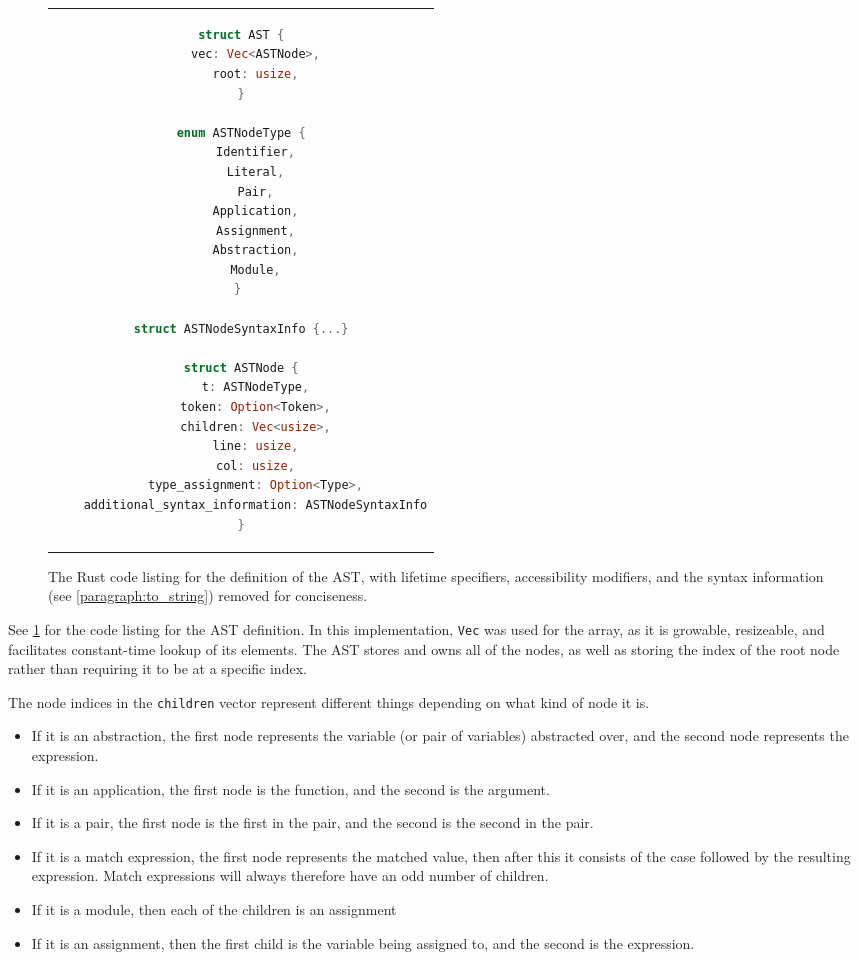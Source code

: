 \begin{figure}[t]
    \centering
    \begin{tabular}{c}
    \begin{lstlisting}[language=Rust]
struct AST {
    vec: Vec<ASTNode>,
    root: usize,
}

enum ASTNodeType {
    Identifier,
    Literal,
    Pair,
    Application,
    Assignment,
    Abstraction,
    Module,
} 

struct ASTNodeSyntaxInfo {...}

struct ASTNode {
    t: ASTNodeType,
    token: Option<Token>,
    children: Vec<usize>,
    line: usize,
    col: usize,
    type_assignment: Option<Type>,
    additional_syntax_information: ASTNodeSyntaxInfo
}
    \end{lstlisting}
    \end{tabular}
    \caption{The Rust code listing for the definition of the AST, with lifetime specifiers, accessibility modifiers, and the syntax information (see \ref{paragraph:to_string}) removed for conciseness.}
    \label{fig:ast_lst}
\end{figure}

See \ref{fig:ast_lst} for the code listing for the AST definition. In this implementation, \verb|Vec| was used for the array, as it is growable, resizeable, and facilitates constant-time lookup of its elements. The AST stores and owns all of the nodes, as well as storing the index of the root node rather than requiring it to be at a specific index. 

The node indices in the \verb|children| vector represent different things depending on what kind of node it is. 
\begin{itemize}
    \item If it is an abstraction, the first node represents the variable (or pair of variables) abstracted over, and the second node represents the expression.
    \item If it is an application, the first node is the function, and the second is the argument.
    \item If it is a pair, the first node is the first in the pair, and the second is the second in the pair.
    \item If it is a match expression, the first node represents the matched value, then after this it consists of the case followed by the resulting expression. Match expressions will always therefore have an odd number of children.
    \item If it is a module, then each of the children is an assignment
    \item If it is an assignment, then the first child is the variable being assigned to, and the second is the expression.
\end{itemize}

